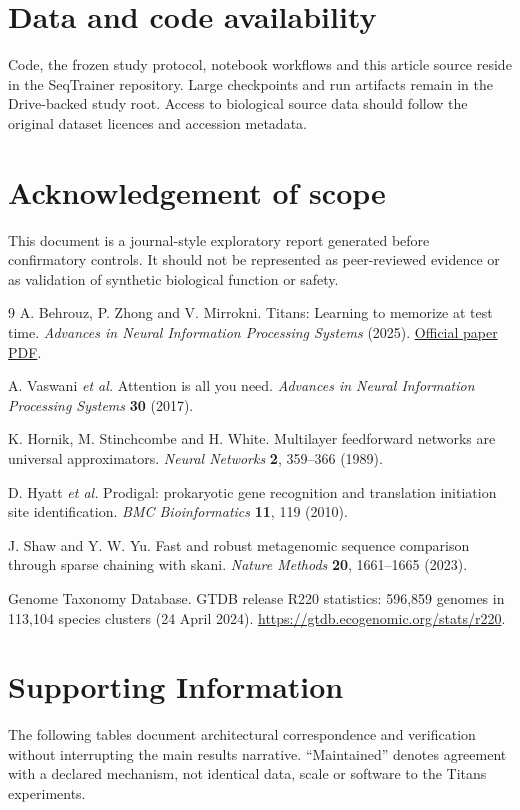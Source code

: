 \documentclass[10pt,twocolumn]{article}
\begin{document}
\section*{Data and code availability}
Code, the frozen study protocol, notebook workflows and this article source reside in the SeqTrainer repository. Large checkpoints and run artifacts remain in the Drive-backed study root. Access to biological source data should follow the original dataset licences and accession metadata.

\section*{Acknowledgement of scope}
This document is a journal-style exploratory report generated before confirmatory controls. It should not be represented as peer-reviewed evidence or as validation of synthetic biological function or safety.

\begin{thebibliography}{9}
A. Behrouz, P. Zhong and V. Mirrokni. Titans: Learning to memorize at test time. \emph{Advances in Neural Information Processing Systems} (2025). \href{https://proceedings.neurips.cc/paper_files/paper/2025/file/a4ca07aa108036f80cbb5b82285fd4b1-Paper-Conference.pdf}{Official paper PDF}.

A. Vaswani \emph{et al.} Attention is all you need. \emph{Advances in Neural Information Processing Systems} \textbf{30} (2017).

K. Hornik, M. Stinchcombe and H. White. Multilayer feedforward networks are universal approximators. \emph{Neural Networks} \textbf{2}, 359--366 (1989).

D. Hyatt \emph{et al.} Prodigal: prokaryotic gene recognition and translation initiation site identification. \emph{BMC Bioinformatics} \textbf{11}, 119 (2010).

J. Shaw and Y. W. Yu. Fast and robust metagenomic sequence comparison through sparse chaining with skani. \emph{Nature Methods} \textbf{20}, 1661--1665 (2023).

Genome Taxonomy Database. GTDB release R220 statistics: 596,859 genomes in 113,104 species clusters (24 April 2024). \url{https://gtdb.ecogenomic.org/stats/r220}.
\end{thebibliography}

\section*{Supporting Information}
The following tables document architectural correspondence and verification without interrupting the main results narrative. ``Maintained'' denotes agreement with a declared mechanism, not identical data, scale or software to the Titans experiments.
\end{document}
